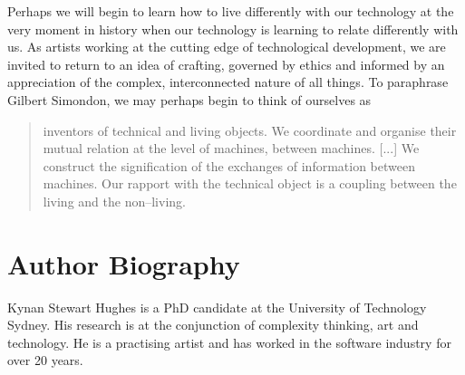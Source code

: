 \documentclass[letter:wpaper]{article}
\begin{document}
    Perhaps we will begin to learn how to live differently with our technology at the very moment in history when our technology is learning to relate differently with us. As artists working at the cutting edge of technological development, we are invited to return to an idea of crafting, governed by ethics and informed by an appreciation of the complex, interconnected nature of all things. To paraphrase Gilbert Simondon, we may perhaps begin to think of ourselves as
    
    \begin{quote}
        inventors of technical and living objects. We coordinate and organise their mutual relation at the level of machines, between machines. [...] We construct the signification of the exchanges of information between machines. Our rapport with the technical object is a coupling between the living and the non–living. \citep[p.xvi]{SimondonOnThMdOfExstncOfTechnclObjcts1980}
    \end{quote}
    



\section{Author Biography}

Kynan Stewart Hughes is a PhD candidate at the University of Technology Sydney. His research is at the conjunction of complexity thinking, art and technology. He is a practising artist and has worked in the software industry for over 20 years. 
\end{document}
